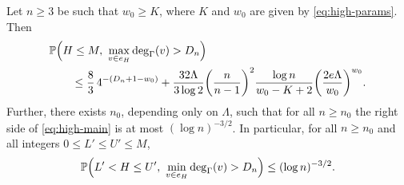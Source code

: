 \begin{theorem}\label{thm:high-main}
Let $n \ge 3$ be such that $w_0 \ge K$, where $K$ and $w_0$ are given by \eqref{eq:high-params}. Then
\begin{equation}\label{eq:high-main}
\begin{split}
&\mathbb P \Bigl( H \le M, \ \max_{v \in e_H} \deg_\Gamma(v) > D_n \Bigr)\\
&\qquad \le \frac{8}{3} \, 4^{-(D_n + 1 - w_0)} + \frac{32 \Lambda}{3 \log 2} \biggl( \frac{n}{n - 1} \biggr)^2 \frac{\log n}{w_0 - K + 2} \biggl( \frac{2 e \Lambda}{w_0} \biggr)^{w_0}.
\end{split}
\end{equation}
Further, there exists $n_0$, depending only on $\Lambda$, such that for all $n \ge n_0$ the right side of \eqref{eq:high-main} is at most $(\log n)^{-3/2}$. In particular, for all $n \ge n_0$ and all integers $0 \le L' \le U' \le M$,
\begin{equation}\label{eq:high-main-window}
\mathbb P \Bigl( L' < H \le U', \ \min_{v \in e_H} \deg_\Gamma(v) > D_n \Bigr) \le (\log n)^{-3/2}.
\end{equation}
\end{theorem}

